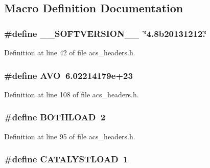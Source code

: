 \subsection{Macro Definition Documentation}
\hypertarget{a00072_aab38659c2fe462437b89a1e85e619dc7}{
\subsubsection[{\-\_\-\-\_\-\-S\-O\-F\-T\-V\-E\-R\-S\-I\-O\-N\-\_\-\-\_\-}]{\setlength{\rightskip}{0pt plus 5cm}\#define \-\_\-\-\_\-\-S\-O\-F\-T\-V\-E\-R\-S\-I\-O\-N\-\_\-\-\_\-~\char`\"{}4.\-8b20131212.\char`\"{}}}\label{a00072_aab38659c2fe462437b89a1e85e619dc7}


Definition at line 42 of file acs\-\_\-headers.\-h.

\hypertarget{a00072_a174754c04acfba9e1f66ba249e68643a}{
\subsubsection[{A\-V\-O}]{\setlength{\rightskip}{0pt plus 5cm}\#define A\-V\-O~6.\-02214179e+23}}\label{a00072_a174754c04acfba9e1f66ba249e68643a}


Definition at line 108 of file acs\-\_\-headers.\-h.

\hypertarget{a00072_afb6d1105a81463fbadceff0217332f68}{
\subsubsection[{B\-O\-T\-H\-L\-O\-A\-D}]{\setlength{\rightskip}{0pt plus 5cm}\#define B\-O\-T\-H\-L\-O\-A\-D~2}}\label{a00072_afb6d1105a81463fbadceff0217332f68}


Definition at line 95 of file acs\-\_\-headers.\-h.

\hypertarget{a00072_a7e521c899f69e37df3501fd0e652c517}{
\subsubsection[{C\-A\-T\-A\-L\-Y\-S\-T\-L\-O\-A\-D}]{\setlength{\rightskip}{0pt plus 5cm}\#define C\-A\-T\-A\-L\-Y\-S\-T\-L\-O\-A\-D~1}}\label{a00072_a7e521c899f69e37df3501fd0e652c517}


